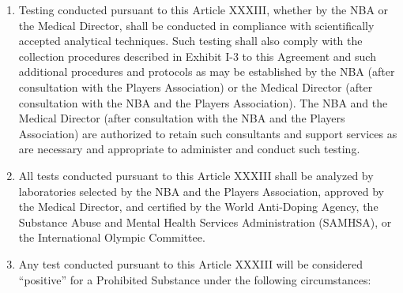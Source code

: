 \documentclass[
]{book}
\providecommand{\tightlist}{%
  \setlength{\itemsep}{0pt}\setlength{\parskip}{0pt}}
\begin{document}
\begin{enumerate}
\def\labelenumi{(\alph{enumi})}
\tightlist
\item
  Testing conducted pursuant to this Article XXXIII, whether by the NBA or the Medical Director, shall be conducted in compliance with scientifically accepted analytical techniques. Such testing shall also comply with the collection procedures described in Exhibit I-3 to this Agreement and such additional procedures and protocols as may be established by the NBA (after consultation with the Players Association) or the Medical Director (after consultation with the NBA and the Players Association). The NBA and the Medical Director (after consultation with the NBA and the Players Association) are authorized to retain such consultants and support services as are necessary and appropriate to administer and conduct such testing.
\item
  All tests conducted pursuant to this Article XXXIII shall be analyzed by laboratories selected by the NBA and the Players Association, approved by the Medical Director, and certified by the World Anti-Doping Agency, the Substance Abuse and Mental Health Services Administration (SAMHSA), or the International Olympic Committee.
\item
  Any test conducted pursuant to this Article XXXIII will be considered ``positive'' for a Prohibited Substance under the following circumstances:


\end{enumerate}
\end{document}
